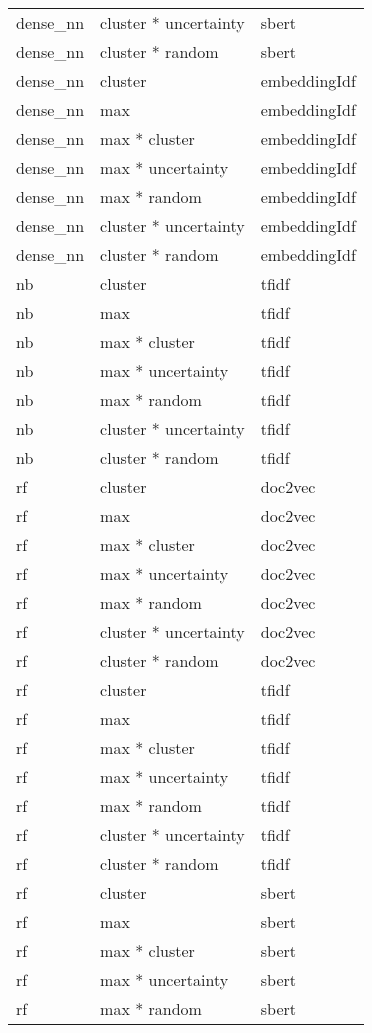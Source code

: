 \documentclass[
]{article}
\begin{document}
\begin{longtable}{lll}
dense\_nn & cluster * uncertainty & sbert\\
\addlinespace
dense\_nn & cluster * random & sbert\\
dense\_nn & cluster & embeddingIdf\\
dense\_nn & max & embeddingIdf\\
dense\_nn & max * cluster & embeddingIdf\\
dense\_nn & max * uncertainty & embeddingIdf\\
\addlinespace
dense\_nn & max * random & embeddingIdf\\
dense\_nn & cluster * uncertainty & embeddingIdf\\
dense\_nn & cluster * random & embeddingIdf\\
nb & cluster & tfidf\\
nb & max & tfidf\\
\addlinespace
nb & max * cluster & tfidf\\
nb & max * uncertainty & tfidf\\
nb & max * random & tfidf\\
nb & cluster * uncertainty & tfidf\\
nb & cluster * random & tfidf\\
\addlinespace
rf & cluster & doc2vec\\
rf & max & doc2vec\\
rf & max * cluster & doc2vec\\
rf & max * uncertainty & doc2vec\\
rf & max * random & doc2vec\\
\addlinespace
rf & cluster * uncertainty & doc2vec\\
rf & cluster * random & doc2vec\\
rf & cluster & tfidf\\
rf & max & tfidf\\
rf & max * cluster & tfidf\\
\addlinespace
rf & max * uncertainty & tfidf\\
rf & max * random & tfidf\\
rf & cluster * uncertainty & tfidf\\
rf & cluster * random & tfidf\\
rf & cluster & sbert\\
\addlinespace
rf & max & sbert\\
rf & max * cluster & sbert\\
rf & max * uncertainty & sbert\\
rf & max * random & sbert\\

\end{longtable}
\end{document}
